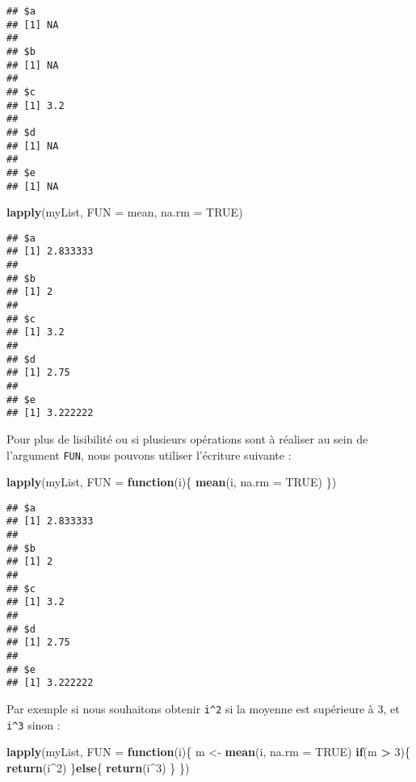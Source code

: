 \documentclass[]{book}
\newenvironment{Shaded}{\begin{snugshade}}{\end{snugshade}}
\newcommand{\KeywordTok}[1]{\textcolor[rgb]{0.13,0.29,0.53}{\textbf{#1}}}
\newcommand{\DataTypeTok}[1]{\textcolor[rgb]{0.13,0.29,0.53}{#1}}
\newcommand{\DecValTok}[1]{\textcolor[rgb]{0.00,0.00,0.81}{#1}}
\newcommand{\StringTok}[1]{\textcolor[rgb]{0.31,0.60,0.02}{#1}}
\newcommand{\OtherTok}[1]{\textcolor[rgb]{0.56,0.35,0.01}{#1}}
\newcommand{\ControlFlowTok}[1]{\textcolor[rgb]{0.13,0.29,0.53}{\textbf{#1}}}
\newcommand{\OperatorTok}[1]{\textcolor[rgb]{0.81,0.36,0.00}{\textbf{#1}}}
\newcommand{\NormalTok}[1]{#1}
\theoremstyle{definition}
\theoremstyle{definition}
\theoremstyle{definition}
\theoremstyle{remark}
\begin{document}
\begin{verbatim}
## $a
## [1] NA
## 
## $b
## [1] NA
## 
## $c
## [1] 3.2
## 
## $d
## [1] NA
## 
## $e
## [1] NA
\end{verbatim}

\begin{Shaded}
\begin{Highlighting}[]
\KeywordTok{lapply}\NormalTok{(myList, }\DataTypeTok{FUN =}\NormalTok{ mean, }\DataTypeTok{na.rm =} \OtherTok{TRUE}\NormalTok{)}
\end{Highlighting}
\end{Shaded}

\begin{verbatim}
## $a
## [1] 2.833333
## 
## $b
## [1] 2
## 
## $c
## [1] 3.2
## 
## $d
## [1] 2.75
## 
## $e
## [1] 3.222222
\end{verbatim}

Pour plus de lisibilité ou si plusieurs opérations sont à réaliser au
sein de l'argument \texttt{FUN}, nous pouvons utiliser l'écriture
suivante :

\begin{Shaded}
\begin{Highlighting}[]
\KeywordTok{lapply}\NormalTok{(myList, }\DataTypeTok{FUN =} \ControlFlowTok{function}\NormalTok{(i)\{}
  \KeywordTok{mean}\NormalTok{(i, }\DataTypeTok{na.rm =} \OtherTok{TRUE}\NormalTok{)}
\NormalTok{\})}
\end{Highlighting}
\end{Shaded}

\begin{verbatim}
## $a
## [1] 2.833333
## 
## $b
## [1] 2
## 
## $c
## [1] 3.2
## 
## $d
## [1] 2.75
## 
## $e
## [1] 3.222222
\end{verbatim}

Par exemple si nous souhaitons obtenir \texttt{i\^{}2} si la moyenne est
supérieure à 3, et \texttt{i\^{}3} sinon :

\begin{Shaded}
\begin{Highlighting}[]
\KeywordTok{lapply}\NormalTok{(myList, }\DataTypeTok{FUN =} \ControlFlowTok{function}\NormalTok{(i)\{}
\NormalTok{  m <-}\StringTok{ }\KeywordTok{mean}\NormalTok{(i, }\DataTypeTok{na.rm =} \OtherTok{TRUE}\NormalTok{)}
  \ControlFlowTok{if}\NormalTok{(m }\OperatorTok{>}\StringTok{ }\DecValTok{3}\NormalTok{)\{}
    \KeywordTok{return}\NormalTok{(i}\OperatorTok{^}\DecValTok{2}\NormalTok{)  }
\NormalTok{  \}}\ControlFlowTok{else}\NormalTok{\{}
    \KeywordTok{return}\NormalTok{(i}\OperatorTok{^}\DecValTok{3}\NormalTok{)}
\NormalTok{  \}}
\NormalTok{\})}
\end{Highlighting}
\end{Shaded}
\end{document}
